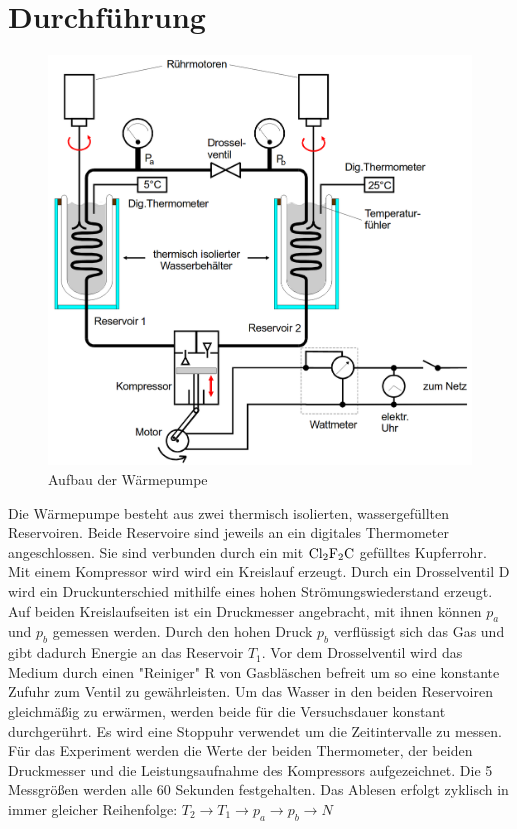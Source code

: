\section{Durchführung}
\label{sec:Durchführung}

\begin{figure}[H]\label{fig:waermepumpe}
    \centering
    \includegraphics[width=1\textwidth]{content/Aufbau_Waermepumpe.png}
    \caption{Aufbau der Wärmepumpe\protect\footnotemark}
\end{figure}

Die Wärmepumpe besteht aus zwei thermisch isolierten, wassergefüllten Reservoiren. Beide Reservoire sind jeweils an ein digitales
Thermometer angeschlossen. Sie sind verbunden durch ein mit $\ce{Cl2F2C}$ gefülltes Kupferrohr. Mit einem Kompressor wird wird 
ein Kreislauf erzeugt. Durch ein Drosselventil D wird ein Druckunterschied mithilfe eines hohen Strömungswiederstand erzeugt. Auf beiden 
Kreislaufseiten ist ein Druckmesser angebracht, mit ihnen können $p_a$ und $p_b$ gemessen werden. Durch den hohen Druck $p_b$
verflüssigt sich das Gas und gibt dadurch Energie an das Reservoir $T_1$. Vor dem Drosselventil wird das Medium durch einen
"Reiniger"  R von Gasbläschen befreit um so eine konstante Zufuhr zum Ventil zu gewährleisten. Um das Wasser in den beiden Reservoiren
gleichmäßig zu erwärmen, werden beide für die Versuchsdauer konstant durchgerührt. Es wird eine Stoppuhr verwendet um die Zeitintervalle zu messen.\\

Für das Experiment werden die Werte der beiden Thermometer, der beiden Druckmesser und die Leistungsaufnahme des Kompressors aufgezeichnet.
Die 5 Messgrößen werden alle 60 Sekunden festgehalten. Das Ablesen erfolgt zyklisch in immer gleicher Reihenfolge: 
$T_2 → T_1 → p_a → p_b → N$

\newpage